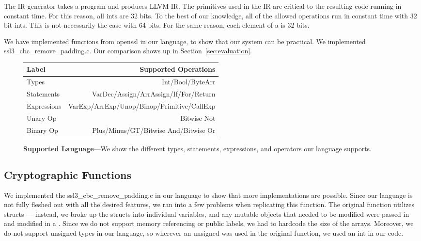  The IR generator takes a \ccore program and produces LLVM IR. The primitives used in the IR are critical to the resulting code running in constant time. For this reason, all ints are 32 bits. To the best of our knowledge, all of the allowed operations run in constant time with 32 bit ints. This is not necessarily the case with 64 bits. For the same reason, each element of a \bytearray is 32 bits.

We have implemented functions from openssl in our language, to show that our
system can be practical. We implemented ssl3\_cbc\_remove\_padding.c. Our
comparison shows up in Section~\ref{sec:evaluation}.

\begin{figure}
        \centering
        \small
        \begin{tabularx}{\columnwidth}{lr}
        \toprule
        Label & Supported Operations\\
        \midrule
        Types &  Int/Bool/ByteArr \\
        Statements & VarDec/Assign/ArrAssign/If/For/Return \\
        Expressions & VarExp/ArrExp/Unop/Binop/Primitive/CallExp \\
        Unary Op &  Bitwise Not \\
        Binary Op & Plus/Minus/GT/Bitwise And/Bitwise Or \\
        \bottomrule
        \end{tabularx}
        \caption{\textbf{Supported Language}---We show the different types,
        statements, expressions, and operators our language supports.}
    \label{table:functions}
\end{figure}

\subsection{Cryptographic Functions}

 We implemented the ssl3\_cbc\_remove\_padding.c in our language to show that more implementations are possible. Since our language is not fully fleshed out with all the desired features, we ran into a few problems when replicating this function. The original function utilizes structs --- instead, we broke up the structs into individual variables, and any mutable objects that needed to be modified were passed in and modified in a \bytearray. Since we do not support memory referencing or public labels, we had to hardcode the size of the arrays. Moreover, we do not support unsigned types in our language, so wherever an unsigned was used in the original function, we used an int in our code.
